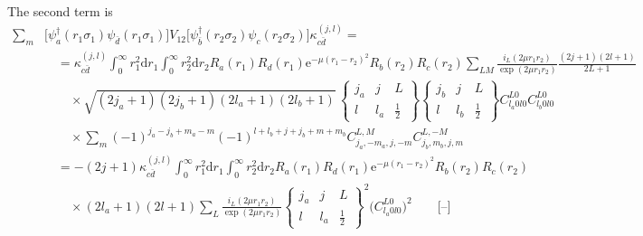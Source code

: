 \documentclass[10pt,a4paper]{article}
\begin{document}
The second term is
\begin{align}
\sum_m &\big[\psi_a^\dagger(r_1\sigma_1)\psi_{\bar{d}}(r_1\sigma_1)\big]V_{12}
\big[\psi_{\bar{b}}^\dagger(r_2\sigma_2)\psi_c(r_2\sigma_2)\big]
\kappa_{c\bar{d}}^{(j,l)} = \nonumber\\
&\quad =\kappa_{c\bar{d}}^{(j,l)} \int_0^\infty r_1^2\mathrm{d}r_1
\int_0^\infty r_2^2\mathrm{d}r_2 R_a(r_1) R_d(r_1) \mathrm{e}^{-\mu(r_1-r_2)^2}
R_b(r_2) R_c(r_2) \sum_{LM}\frac{i_L(2\mu r_1 r_2)}{\exp(2\mu r_1 r_2)}
\frac{(2j+1)(2l+1)}{2L+1} \nonumber\\
&\qquad\times\sqrt{(2j_a+1)(2j_b+1)(2l_a+1)(2l_b+1)}\,
\begin{Bmatrix} j_a & j & L \\ l & l_a & \frac{1}{2} \end{Bmatrix}
\begin{Bmatrix} j_b & j & L \\ l & l_b & \frac{1}{2} \end{Bmatrix}
C_{l_a 0 l 0}^{L0} C_{l_b 0 l 0}^{L0} \nonumber\\
&\qquad\times\sum_m (-1)^{j_a-j_b+m_a-m}(-1)^{l+l_b+j+j_b+m+m_b}
C_{j_a,-m_a,j,-m}^{L,M} C_{j_b,m_b,j,m}^{L,-M} \nonumber\\
&\quad= -(2j+1)\kappa_{c\bar{d}}^{(j,l)} \int_0^\infty r_1^2\mathrm{d}r_1
\int_0^\infty r_2^2\mathrm{d}r_2 R_a(r_1) R_d(r_1) \mathrm{e}^{-\mu(r_1-r_2)^2}
R_b(r_2) R_c(r_2) \nonumber\\
&\qquad\times(2l_a+1)(2l+1) \sum_L\frac{i_L(2\mu r_1 r_2)}{\exp(2\mu r_1 r_2)}
\begin{Bmatrix} j_a & j & L \\ l & l_a & \frac{1}{2} \end{Bmatrix}^2
\Big(C_{l_a 0 l 0}^{L0}\Big)^2 \qquad \textbf{[--]}
\end{align}
\end{document}
